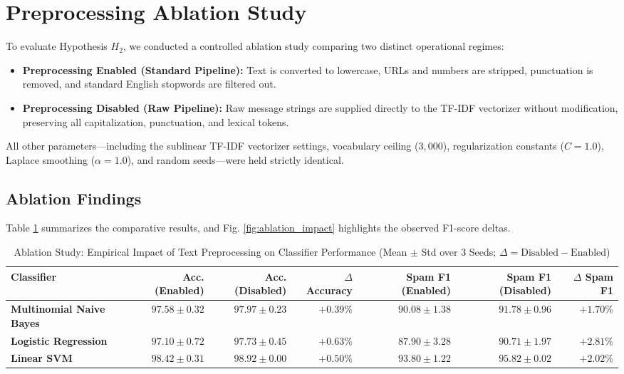 \documentclass[conference]{IEEEtran}
\begin{document}
\section{Preprocessing Ablation Study}
To evaluate Hypothesis $H_2$, we conducted a controlled ablation study comparing two distinct operational regimes:
\begin{itemize}
    \item \textbf{Preprocessing Enabled (Standard Pipeline):} Text is converted to lowercase, URLs and numbers are stripped, punctuation is removed, and standard English stopwords are filtered out.
    \item \textbf{Preprocessing Disabled (Raw Pipeline):} Raw message strings are supplied directly to the TF-IDF vectorizer without modification, preserving all capitalization, punctuation, and lexical tokens.
\end{itemize}
All other parameters---including the sublinear TF-IDF vectorizer settings, vocabulary ceiling ($3,000$), regularization constants ($C=1.0$), Laplace smoothing ($\alpha=1.0$), and random seeds---were held strictly identical.

\subsection{Ablation Findings}
Table \ref{tab:ablation_results} summarizes the comparative results, and Fig. \ref{fig:ablation_impact} highlights the observed F1-score deltas.

\begin{table}[t]
\caption{Ablation Study: Empirical Impact of Text Preprocessing on Classifier Performance (Mean $\pm$ Std over 3 Seeds; $\Delta = \text{Disabled} - \text{Enabled}$)}
\label{tab:ablation_results}
\centering
\begin{tabular}{lrrrrrr}
\toprule
\textbf{Classifier} & \textbf{Acc. (Enabled)} & \textbf{Acc. (Disabled)} & \textbf{$\Delta$ Accuracy} & \textbf{Spam F1 (Enabled)} & \textbf{Spam F1 (Disabled)} & \textbf{$\Delta$ Spam F1} \\
\midrule
\textbf{Multinomial Naive Bayes} & $97.58 \pm 0.32$ & $97.97 \pm 0.23$ & $+0.39\%$ & $90.08 \pm 1.38$ & $91.78 \pm 0.96$ & $\mathbf{+1.70\%}$ \\
\textbf{Logistic Regression}     & $97.10 \pm 0.72$ & $97.73 \pm 0.45$ & $+0.63\%$ & $87.90 \pm 3.28$ & $90.71 \pm 1.97$ & $\mathbf{+2.81\%}$ \\
\textbf{Linear SVM}              & $98.42 \pm 0.31$ & $98.92 \pm 0.00$ & $+0.50\%$ & $93.80 \pm 1.22$ & $95.82 \pm 0.02$ & $\mathbf{+2.02\%}$ \\
\bottomrule
\end{tabular}
\end{table}
\end{document}
